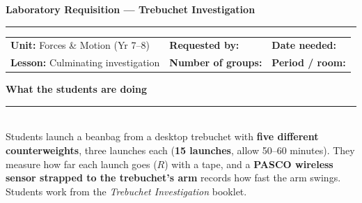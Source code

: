 \documentclass[11pt,a4paper]{article}
\newcommand{\sechead}[1]{%
  \vspace{2pt}%
  {\bfseries\large\color{HeadGrey} #1}\\[-2pt]
  {\color{RuleGrey}\rule{\linewidth}{0.8pt}}\\[2pt]
}
\begin{document}
\pagestyle{empty}
\small

{\LARGE\bfseries\color{Ink} Laboratory Requisition --- Trebuchet Investigation}\\[3pt]
{\color{RuleGrey}\rule{\linewidth}{1.2pt}}

\vspace{3pt}
\begin{tabularx}{\linewidth}{@{}X X X@{}}
\textbf{Unit:} Forces \& Motion (Yr 7--8) &
\textbf{Requested by:} \underline{\hspace{3.5cm}} &
\textbf{Date needed:} \underline{\hspace{2.8cm}} \\
\textbf{Lesson:} Culminating investigation &
\textbf{Number of groups:} \underline{\hspace{2cm}} &
\textbf{Period / room:} \underline{\hspace{2.6cm}} \\
\end{tabularx}

\sechead{What the students are doing}
Students launch a beanbag from a desktop trebuchet with \textbf{five different counterweights}, three launches each (\textbf{15 launches}, allow 50--60 minutes). They measure how far each launch goes ($R$) with a tape, and a \textbf{PASCO wireless sensor strapped to the trebuchet's arm} records how fast the arm swings. Students work from the \emph{Trebuchet Investigation} booklet.
\end{document}
